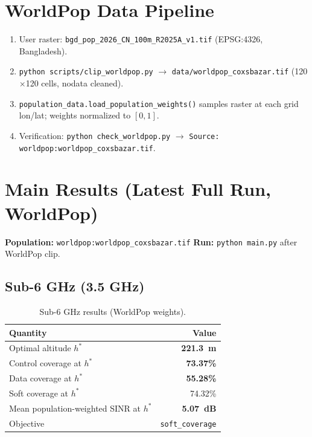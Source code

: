 \documentclass[11pt,a4paper]{article}
\begin{document}
\section{WorldPop Data Pipeline}

\begin{enumerate}
  \item User raster: \texttt{bgd\_pop\_2026\_CN\_100m\_R2025A\_v1.tif} (EPSG:4326, Bangladesh).
  \item \texttt{python scripts/clip\_worldpop.py} $\rightarrow$
        \texttt{data/worldpop\_coxsbazar.tif} (120$\times$120 cells, nodata cleaned).
  \item \texttt{population\_data.load\_population\_weights()} samples raster at each grid
        lon/lat; weights normalized to $[0,1]$.
  \item Verification: \texttt{python check\_worldpop.py} $\rightarrow$
        \texttt{Source: worldpop:worldpop\_coxsbazar.tif}.
\end{enumerate}

\section{Main Results (Latest Full Run, WorldPop)}

\textbf{Population:} \texttt{worldpop:worldpop\_coxsbazar.tif} \quad
\textbf{Run:} \texttt{python main.py} after WorldPop clip.

\subsection{Sub-6 GHz (3.5 GHz)}
\begin{table}[H]
\centering
\caption{Sub-6 GHz results (WorldPop weights).}
\label{tab:sub6}
\begin{tabular}{lr}
\toprule
Quantity & Value \\
\midrule
Optimal altitude $h^\ast$ & \textbf{221.3~m} \\
Control coverage at $h^\ast$ & \textbf{73.37\%} \\
Data coverage at $h^\ast$ & \textbf{55.28\%} \\
Soft coverage at $h^\ast$ & 74.32\% \\
Mean population-weighted SINR at $h^\ast$ & \textbf{5.07~dB} \\
Objective & \texttt{soft\_coverage} \\
\bottomrule
\end{tabular}
\end{table}
\end{document}
